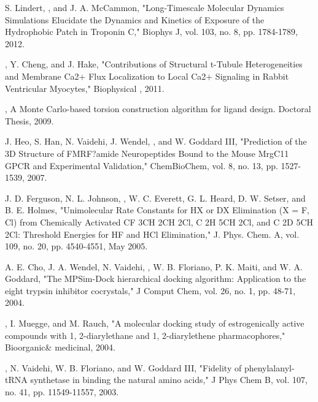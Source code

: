\documentclass{res} %
\begin{document}
\begin{resume}
\begin{etaremune}
\item S. Lindert, \pmkh, and J. A. McCammon, "Long-Timescale Molecular Dynamics Simulations Elucidate the Dynamics and Kinetics of Exposure of the Hydrophobic Patch in Troponin C," Biophys J, vol. 103, no. 8, pp. 1784-1789, 2012.
\item \pmkh, Y. Cheng, and J. Hake, "Contributions of Structural t-Tubule Heterogeneities and Membrane Ca2+ Flux Localization to Local Ca2+ Signaling in Rabbit Ventricular Myocytes," Biophysical , 2011.
\item \pmkh, A Monte Carlo-based torsion construction algorithm for ligand design. Doctoral Thesis, 2009.
\item J. Heo, S. Han, N. Vaidehi, J. Wendel, \pmkh, and W. Goddard III, "Prediction of the 3D Structure of FMRF?amide Neuropeptides Bound to the Mouse MrgC11 GPCR and Experimental Validation," ChemBioChem, vol. 8, no. 13, pp. 1527-1539, 2007.
\item J. D. Ferguson, N. L. Johnson, \pmkh, W. C. Everett, G. L. Heard, D. W. Setser, and B. E. Holmes, "Unimolecular Rate Constants for HX or DX Elimination (X = F, Cl) from Chemically Activated CF 3CH 2CH 2Cl, C 2H 5CH 2Cl, and C 2D 5CH 2Cl:  Threshold Energies for HF and HCl Elimination," J. Phys. Chem. A, vol. 109, no. 20, pp. 4540-4551, May 2005.
\item A. E. Cho, J. A. Wendel, N. Vaidehi, \pmkh, W. B. Floriano, P. K. Maiti, and W. A. Goddard, "The MPSim-Dock hierarchical docking algorithm: Application to the eight trypsin inhibitor cocrystals," J Comput Chem, vol. 26, no. 1, pp. 48-71, 2004.
\item \pmkh, I. Muegge, and M. Rauch, "A molecular docking study of estrogenically active compounds with 1, 2-diarylethane and 1, 2-diarylethene pharmacophores," Bioorganic\& medicinal, 2004.
\item \pmkh, N. Vaidehi, W. B. Floriano, and W. Goddard III, "Fidelity of phenylalanyl-tRNA synthetase in binding the natural amino acids," J Phys Chem B, vol. 107, no. 41, pp. 11549-11557, 2003.

\end{etaremune}




\vspace{0.2in} %



\end{resume}
\end{document}
